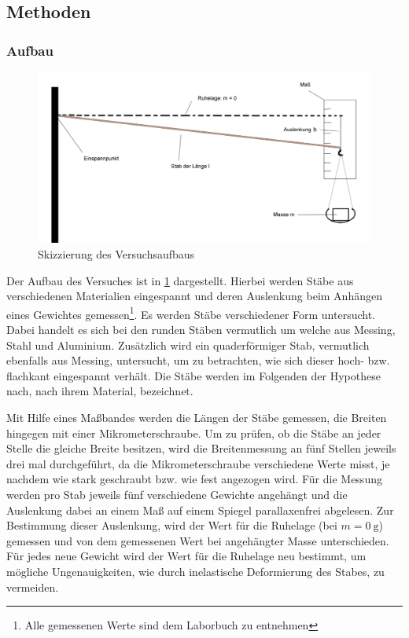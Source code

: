 \documentclass[11pt,a4paper,titlepage, ngerman]{article}
\begin{document}
	\subsection{Methoden}	
	
		\subsubsection*{Aufbau}
				
			\begin{figure}[ht]
				\centering
				\includegraphics[width=\textwidth]{StabAuslenkungSkizze.png}
				\caption{Skizzierung des Versuchsaufbaus}
				\label{abb:Versuchsskizze1}	
			\end{figure}	
			Der Aufbau des Versuches ist in \cref{abb:Versuchsskizze1} dargestellt. Hierbei werden Stäbe aus verschiedenen Materialien eingespannt und deren Auslenkung beim Anhängen eines Gewichtes gemessen\footnote{Alle gemessenen Werte sind dem Laborbuch zu entnehmen}. 
			Es werden Stäbe verschiedener Form untersucht. Dabei handelt es sich bei den runden Stäben vermutlich um welche aus Messing, Stahl und Aluminium. Zusätzlich wird ein quaderförmiger Stab, vermutlich ebenfalls aus Messing, untersucht, um zu betrachten, wie sich dieser hoch- bzw. flachkant eingespannt verhält. Die Stäbe werden im Folgenden der Hypothese nach, nach ihrem Material, bezeichnet.
			
			Mit Hilfe eines Maßbandes werden die Längen der Stäbe gemessen, die Breiten hingegen mit einer Mikrometerschraube. Um zu prüfen, ob die Stäbe an jeder Stelle die gleiche Breite besitzen, wird die Breitenmessung an fünf Stellen jeweils drei mal durchgeführt, da die Mikrometerschraube verschiedene Werte misst, je nachdem wie stark geschraubt bzw. wie fest angezogen wird. 
			Für die Messung werden pro Stab jeweils fünf verschiedene Gewichte angehängt und die Auslenkung dabei an einem Maß auf einem Spiegel parallaxenfrei abgelesen. Zur Bestimmung dieser Auslenkung, wird der Wert für die Ruhelage (bei $m=\SI{0}{\g}$) gemessen und von dem gemessenen Wert bei angehängter Masse unterschieden. Für jedes neue Gewicht wird der Wert für die Ruhelage neu bestimmt, um mögliche Ungenauigkeiten, wie durch inelastische Deformierung des Stabes, zu vermeiden.
		
\end{document}
